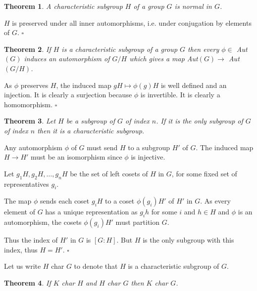 \documentclass[10pt]{article}
\newtheorem{theorem}{Theorem}[section]
\newenvironment{proof}[1][Proof]{\begin{trivlist}
\item[\hskip \labelsep {\itshape #1}]}{\end{trivlist}}
\begin{document}
\begin{theorem}
A characteristic subgroup $H$ of a group $G$ is normal in $G$.
\end{theorem}

\begin{proof}
$H$ is preserved under all inner automorphisms, i.e. under conjugation by elements of $G$. $\square$
\end{proof}

\begin{theorem}
If $H$ is a characteristic subgroup of a group $G$ then every $\phi \in$ Aut$(G)$ induces an automorphism of $G/H$ which gives a map Aut$(G) \to$ Aut$(G/H)$.
\end{theorem}

\begin{proof}
As $\phi$ preserves $H$, the induced map $gH \mapsto \phi(g)H$ is well defined and an injection. It is clearly a surjection because $\phi$ is invertible. It is clearly a homomorphism. $\square$
\end{proof}

\begin{theorem}
Let $H$ be a subgroup of $G$ of index $n$. If it is the only subgroup of $G$ of index $n$ then it is a characteristic subgroup.
\end{theorem}

\begin{proof}
Any automorphism $\phi$ of $G$ must send $H$ to a subgroup $H'$ of $G$. The induced map $H \to H'$ must be an isomorphism since $\phi$ is injective.

Let $g_1H, g_2H, \ldots, g_nH$ be the set of left cosets of $H$ in $G$, for some fixed set of representatives $g_i$.

The map $\phi$ sends each coset $g_iH$ to a coset $\phi(g_i)H'$ of $H'$ in $G$. As every element of $G$ has a unique representation as $g_ih$ for some $i$ and $h \in H$ and $\phi$ is an automorphism, the cosets $\phi(g_i)H'$ must partition $G$.

Thus the index of $H'$ in $G$ is $[G:H]$. But $H$ is the only subgroup with this index, thus $H = H'$. $\square$
\end{proof}

Let us write $H$ char $G$ to denote that $H$ is a characteristic subgroup of $G$.

\begin{theorem}
If $K$ char $H$ and $H$ char $G$ then $K$ char $G$.
\end{theorem}
\end{document}
